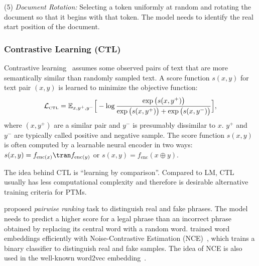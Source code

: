\documentclass[fleqn]{SCYE-arxiv}
\begin{document}
\begin{multicols}{2}
(5) \textit{Document Rotation:} Selecting a token uniformly at random and rotating the document so that it begins with that token. The model needs to identify the real start position of the document.

\subsubsection{Contrastive Learning (CTL)}

Contrastive learning~\cite{saunshi2019theoretical}
assumes some observed pairs of text that are more semantically similar than randomly sampled
text. A score function $s(x,y)$ for text pair $(x,y)$ is learned to minimize the objective function:
\begin{align}
\mathcal{L}_{\textrm{\tiny CTL}}=\mathbb{E}_{x,y^{+},y^{-}}\Big[-\log \frac{ \exp\big(s(x,y^{+})\big)}
{\exp\big(s(x,y^{+})\big)+\exp\big(s(x,y^{-})\big)
}
\Big],
\end{align}
where $(x, y^{+})$ are a similar pair and $y^{-}$
is presumably dissimilar to $x$. $y^{+}$ and $y^{-}$ are typically called positive and negative sample. The score function $s(x,y)$ is often computed by a learnable neural encoder in two ways: $s(x,y)=f_{\mathrm{enc}(x)}\tran f_{\mathrm{enc}(y)}$ or $s(x,y)=f_{\mathrm{enc}}(x\oplus y)$.

The idea behind CTL is ``learning by comparison''.
Compared to LM, CTL usually has less computational complexity and therefore is desirable alternative training criteria for PTMs.

\citet{DBLP:journals/jmlr/CollobertWBKKK11} proposed \textit{pairwise ranking} task to distinguish real and fake phrases. The model needs to predict a higher score for a legal phrase than an incorrect phrase obtained by replacing its central word with a random word.
\citet{mnih2013learning} trained word embeddings efficiently with Noise-Contrastive Estimation (NCE)~\cite{gutmann2010noise}, which trains a binary classifier to distinguish real and fake samples. The idea of NCE is also used in the well-known word2vec embedding~\cite{mikolov2013word2vec}.


%


\end{multicols}
\end{document}
